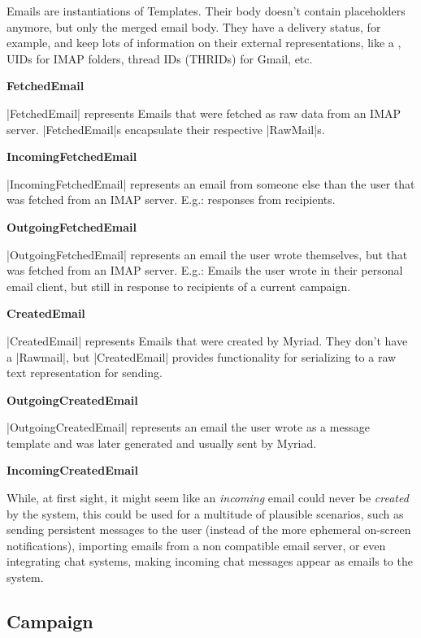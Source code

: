 Emails are instantiations of Templates. Their body doesn’t contain placeholders anymore, but only the merged email body. They have a delivery status, for example, and keep lots of information on their external representations, like a , UIDs for IMAP folders, thread IDs (THRIDs) for Gmail, etc.


\textbf{FetchedEmail}

|FetchedEmail| represents Emails that were fetched as raw data from an IMAP server. |FetchedEmail|s encapsulate their respective |RawMail|s.

\textbf{IncomingFetchedEmail}

|IncomingFetchedEmail| represents an email from someone else than the user that was fetched from an IMAP server. E.g.: responses from recipients.

\textbf{OutgoingFetchedEmail}

|OutgoingFetchedEmail| represents an email the user wrote themselves, but that was fetched from an IMAP server. E.g.: Emails the user wrote in their personal email client, but still in response to recipients of a current campaign.

\textbf{CreatedEmail}

|CreatedEmail| represents Emails that were created by Myriad. They don't have a |Rawmail|, but |CreatedEmail| provides functionality for serializing to a raw text representation for sending.

\textbf{OutgoingCreatedEmail}

|OutgoingCreatedEmail| represents an email the user wrote as a message template and was later generated and usually sent by Myriad.

\textbf{IncomingCreatedEmail}

While, at first sight, it might seem like an \emph{incoming} email could never be \emph{created} by the system, this could be used for a multitude of plausible scenarios, such as sending persistent messages to the user (instead of the more ephemeral on-screen notifications), importing emails from a non  compatible email server, or even integrating chat systems, making incoming chat messages appear as emails to the system.

\subsection{Campaign}


